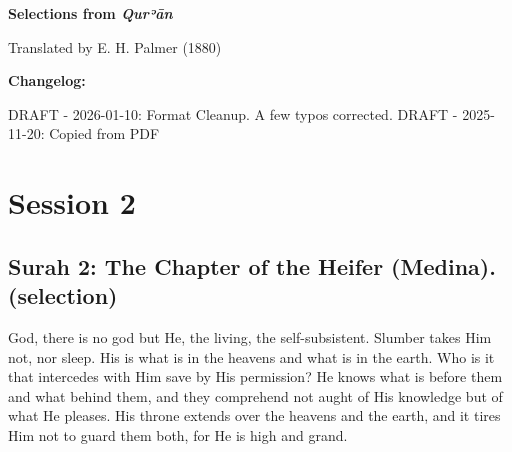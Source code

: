 \documentclass[fontsize=14pt, letterpaper, notitlepage, openany, DIV=12]{scrbook} %
\begin{document}
\begin{titlepage}
  \centering
  {\Huge\bfseries Selections from \textit{Qurʾān}\par}
  \vspace{2cm}
  {\Large Translated by E. H. Palmer (1880)\par}
  \vfill
  {\large
    \textbf{Changelog:}

    DRAFT - 2026-01-10: Format Cleanup. A few typos corrected.
    DRAFT - 2025-11-20: Copied from PDF
    \par}
\end{titlepage}



\renewcommand*\contentsname{QURʾĀN READINGS}
\hypertarget{toc}{
  \tableofcontents
}
\clearpage



\chapter{Session 2}


\section[Surah 2: The Chapter of the Heifer (Medina).]{Surah 2: The Chapter of the Heifer (Medina).\\ (selection)}


\noindent[2:255]
God, there is no god but He, the living, the self-subsistent. Slumber takes Him not, nor
sleep. His is what is in the heavens and what is in the earth. Who is it that intercedes with Him
save by His permission? He knows what is before them and what behind them, and they
comprehend not aught of His knowledge but of what He pleases. His throne extends over the
heavens and the earth, and it tires Him not to guard them both, for He is high and grand.
\end{document}
